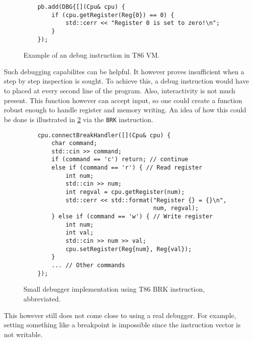 \begin{figure}
    \begin{verbatim}
    pb.add(DBG{[](Cpu& cpu) {
        if (cpu.getRegister(Reg{0}) == 0) {
            std::cerr << "Register 0 is set to zero!\n";
        }
    });
    \end{verbatim}
    \caption{Example of an debug instruction in T86 VM.}
    \label{fig:t86-debug}
\end{figure}

Such debugging capabilites can be helpful. It however proves insufficient
when a step by step inspection is sought. To achieve this, a debug instruction
would have to placed at every second line of the program. Also, interactivity is
not much present. This function however can accept input, so one could create a
function robust enough to handle register and memory writing. An idea of how
this could be done is illustrated in \ref{fig:t86-pocket-debugger} via the
\texttt{BRK} instruction.
\begin{figure}
    \begin{verbatim}
    cpu.connectBreakHandler([](Cpu& cpu) {
        char command;
        std::cin >> command;
        if (command == 'c') return; // continue
        else if (command == 'r') { // Read register
            int num;
            std::cin >> num;
            int regval = cpu.getRegister(num);
            std::cerr << std::format("Register {} = {}\n",
                                     num, regval);
        } else if (command == 'w') { // Write register
            int num;
            int val;
            std::cin >> num >> val;
            cpu.setRegister(Reg{num}, Reg{val});
        }
        ... // Other commands
    });
    \end{verbatim}
    \caption{Small debugger implementation using T86 BRK instruction, abbreviated.}
    \label{fig:t86-pocket-debugger}
\end{figure}
This however still does not come close to using a real debugger.
For example, setting something like a breakpoint is impossible since
the instruction vector is not writable.
